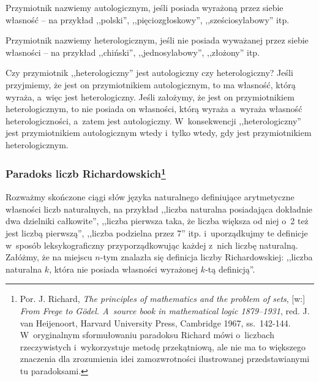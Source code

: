 Przymiotnik nazwiemy autologicznym, jeśli posiada wyrażoną przez siebie własność -- na przykład ,,polski'', ,,pięciozgłoskowy'', ,,sześciosylabowy'' itp.

Przymiotnik nazwiemy heterologicznym, jeśli nie posiada wyważanej przez siebie własności -- na przykład ,,chiński'', ,,jednosylabowy'', ,,złożony'' itp.

Czy przymiotnik ,,heterologiczny'' jest autologiczny czy heterologiczny? Jeśli przyjmiemy, że jest on przymiotnikiem autologicznym, to ma własność, którą wyraża, a~więc jest heterologiczny. Jeśli założymy, że jest on przymiotnikiem heterologicznym, to nie posiada on własności, którą wyraża a~wyraża własność heterologiczności, a~zatem jest autologiczny. W~konsekwencji ,,heterologiczny'' jest przymiotnikiem autologicznym wtedy i~tylko wtedy, gdy jest przymiotnikiem heterologicznym.


\subsubsection[Paradoks liczb Richardowskich]{Paradoks liczb Richardowskich\footnote{Por. J. Richard, \textit{The principles of mathematics and the problem of sets}, [w:] \textit{From Frege to Gödel. A~source book in mathematical logic 1879–1931}, red. J. van Heijenoort, Harvard University Press, Cambridge 1967, ss.~142-144. W~oryginalnym sformułowaniu paradoksu Richard mówi o~liczbach rzeczywistych i~wykorzystuje metodę przekątniową, ale nie ma to większego znaczenia dla zrozumienia idei zamozwrotności ilustrowanej przedstawianymi tu paradoksami.}}


Rozważmy skończone ciągi słów języka naturalnego definiujące arytmetyczne własności liczb naturalnych, na przykład ,,liczba naturalna posiadająca dokładnie dwa dzielniki całkowite'', ,,liczba pierwsza taka, że liczba większa od niej o~2 też jest liczbą pierwszą'', ,,liczba podzielna przez 7'' itp. i~uporządkujmy te definicje w~sposób leksykograficzny przyporządkowując każdej z~nich liczbę naturalną. Załóżmy, że na miejscu $n$-tym znalazła się definicja liczby Richardowskiej: ,,liczba naturalna $k$, która nie posiada własności wyrażonej $k$-tą definicją''.


